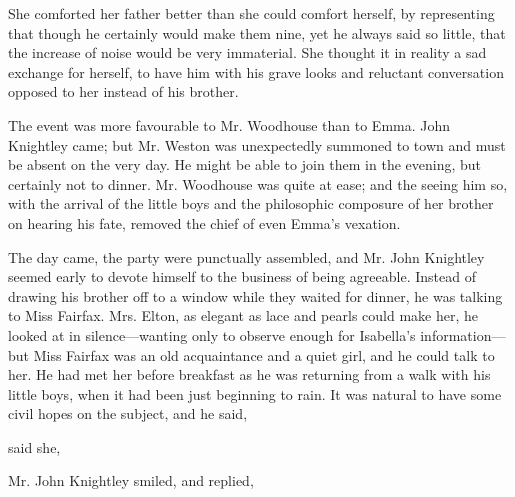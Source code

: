 She comforted her father better than she could comfort herself, by representing that though he certainly would make them nine, yet he always said so little, that the increase of noise would be very immaterial. She thought it in reality a sad exchange for herself, to have him with his grave looks and reluctant conversation opposed to her instead of his brother.

The event was more favourable to Mr. Woodhouse than to Emma. John Knightley came; but Mr. Weston was unexpectedly summoned to town and must be absent on the very day. He might be able to join them in the evening, but certainly not to dinner. Mr. Woodhouse was quite at ease; and the seeing him so, with the arrival of the little boys and the philosophic composure of her brother on hearing his fate, removed the chief of even Emma's vexation.

The day came, the party were punctually assembled, and Mr. John Knightley seemed early to devote himself to the business of being agreeable. Instead of drawing his brother off to a window while they waited for dinner, he was talking to Miss Fairfax. Mrs. Elton, as elegant as lace and pearls could make her, he looked at in silence---wanting only to observe enough for Isabella's information---but Miss Fairfax was an old acquaintance and a quiet girl, and he could talk to her. He had met her before breakfast as he was returning from a walk with his little boys, when it had been just beginning to rain. It was natural to have some civil hopes on the subject, and he said,


 said she, 



Mr. John Knightley smiled, and replied,


